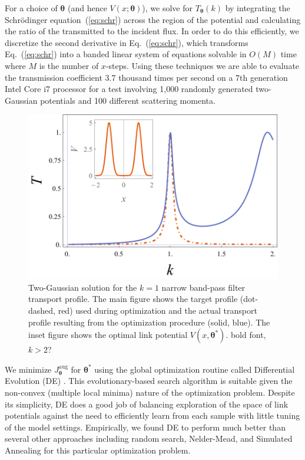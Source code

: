 \documentclass[twocolumn,amsmath,amssymb,showpacs,prl,superscriptaddress,aps]{revtex4-1}
\begin{document}
For a choice of $\bm{\theta}$ (and hence $V(x;\bm{\theta})$), we solve for $T_{\bm{\theta}}(k)$ by integrating the Schr{\"o}dinger equation~(\ref{eq:schr}) across the region of the potential and calculating the ratio of the transmitted to the incident flux. In order to do this efficiently, we discretize the second derivative in Eq.~(\ref{eq:schr}), which transforms Eq.~(\ref{eq:schr}) into
a banded linear system of equations solvable in $O(M)$ time where $M$ is the number of $x$-steps. Using these techniques we are able to evaluate the transmission coefficient 3.7 thousand times per second on a 7th generation Intel Core i7 processor for a test involving 1,000 randomly generated two-Gaussian potentials and 100 different scattering momenta. 

\begin{figure}
   \includegraphics[width=1\linewidth]{figures/plot_transport_profiles_with_inset.pdf}
 \caption[Narrow band-pass filter link potential]{Two-Gaussian solution for the $k=1$ narrow band-pass filter transport profile. The main figure shows the target profile (dot-dashed, red) used during optimization and the actual transport profile resulting from the optimization procedure (solid, blue). The inset figure shows the optimal link potential $V(x, \bm{\theta^*})$. {\color{blue} bold font, $k>2$?}}
 \label{fig:method_illustration}
\end{figure}


We minimize $J_{\bm{\theta}}^{\mathrm{aug}}$ for $\bm{\theta}^*$ using the global optimization routine called Differential Evolution (DE) \cite{storn1997differential}. This evolutionary-based search algorithm is suitable given the non-convex (multiple local minima) nature of the optimization problem. Despite its simplicity, DE does a good job of balancing exploration of the space of link potentials against the need to efficiently learn from each sample with little tuning of the model settings. Empirically, we found DE to perform much better than several other approaches including random search, Nelder-Mead, and Simulated Annealing for this particular optimization problem.
\end{document}
